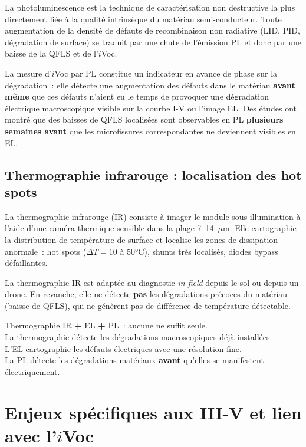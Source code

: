 \documentclass[12pt,a4paper]{report}
\begin{document}
La photoluminescence est la technique de caractérisation non destructive la plus directement liée à la qualité intrinsèque du matériau semi-conducteur. Toute augmentation de la densité de défauts de recombinaison non radiative (LID, PID, dégradation de surface) se traduit par une chute de l'émission PL et donc par une baisse de la QFLS et de l'$i$Voc.

La mesure d'$i$Voc par PL constitue un indicateur \og en avance de phase \fg{} sur la dégradation~: elle détecte une augmentation des défauts dans le matériau \textbf{avant même} que ces défauts n'aient eu le temps de provoquer une dégradation électrique macroscopique visible sur la courbe I-V ou l'image EL. Des études ont montré que des baisses de QFLS localisées sont observables en PL \textbf{plusieurs semaines avant} que les microfissures correspondantes ne deviennent visibles en EL.

\subsection{Thermographie infrarouge : localisation des hot spots}

La thermographie infrarouge (IR) consiste à imager le module sous illumination à l'aide d'une caméra thermique sensible dans la plage 7--14~$\mu$m. Elle cartographie la distribution de température de surface et localise les zones de dissipation anormale~: hot spots ($\Delta T = 10$ à 50°C), shunts très localisés, diodes bypass défaillantes.

La thermographie IR est adaptée au diagnostic \textit{in-field} depuis le sol ou depuis un drone. En revanche, elle ne détecte \textbf{pas} les dégradations précoces du matériau (baisse de QFLS), qui ne génèrent pas de différence de température détectable.

\begin{infobox}[title={Complémentarité des techniques}]
Thermographie IR \textbf{+} EL \textbf{+} PL~: aucune ne suffit seule.\\
La thermographie détecte les dégradations macroscopiques déjà installées.\\
L'EL cartographie les défauts électriques avec une résolution fine.\\
La PL détecte les dégradations matériaux \textbf{avant} qu'elles se manifestent électriquement.
\end{infobox}

\section{Enjeux spécifiques aux III-V et lien avec l'$i$Voc}
\end{document}
